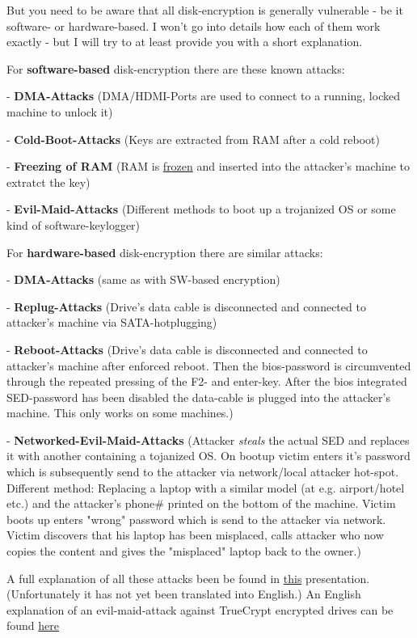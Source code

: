 \documentclass{article}
\begin{document}
 But you need to be aware that all disk-encryption is generally vulnerable - be it software- or hardware-based. I won't go into details how each of them work exactly - but I will try to at least provide you with a short explanation. 


 For \textbf{software-based} disk-encryption there are these known attacks:


 - \textbf{DMA-Attacks} (DMA/HDMI-Ports are used to connect to a running, locked machine to unlock it)


 - \textbf{Cold-Boot-Attacks} (Keys are extracted from RAM after a cold reboot)


 - \textbf{Freezing of RAM} (RAM is \href{http://www.zdnet.com/blog/security/cryogenically-frozen-ram-bypasses-all-disk-encryption-methods/900}{frozen} and inserted into the attacker's machine to extratct the key)


 - \textbf{Evil-Maid-Attacks} (Different methods to boot up a trojanized OS or some kind of software-keylogger)


 For \textbf{hardware-based} disk-encryption there are similar attacks:


 - \textbf{DMA-Attacks} (same as with SW-based encryption)


 - \textbf{Replug-Attacks} (Drive's data cable is disconnected and connected to attacker's machine via SATA-hotplugging)


 - \textbf{Reboot-Attacks} (Drive's data cable is disconnected and connected to attacker's machine after enforced reboot. Then the bios-password is circumvented through the repeated pressing of the F2- and enter-key. After the bios integrated SED-password has been disabled the data-cable is plugged into the attacker's machine. This only works on some machines.)


 - \textbf{Networked-Evil-Maid-Attacks} (Attacker \emph{steals} the actual SED and replaces it with another containing a tojanized OS. On bootup victim enters it's password which is subsequently send to the attacker via network/local attacker hot-spot. Different method: Replacing a laptop with a similar model (at e.g. airport/hotel etc.) and the attacker's phone\# printed on the bottom of the machine. Victim boots up enters "wrong" password which is send to the attacker via network. Victim discovers that his laptop has been misplaced, calls attacker who now copies the content and gives the "misplaced" laptop back to the owner.)


 A full explanation of all these attacks been be found in \href{http://youtu.be/Iax-73hbtEY}{this} presentation. (Unfortunately it has not yet been translated into English.) An English explanation of an evil-maid-attack against TrueCrypt encrypted drives can be found \href{http://theinvisiblethings.blogspot.de/2009/10/evil-maid-goes-after-truecrypt.html}{here}
\end{document}
